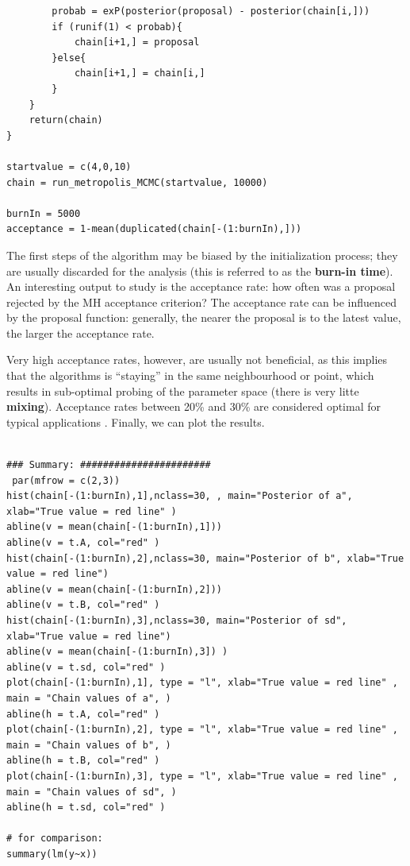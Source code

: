 \begin{Example}
\begin{lstlisting}
        probab = exP(posterior(proposal) - posterior(chain[i,]))
        if (runif(1) < probab){
            chain[i+1,] = proposal
        }else{
            chain[i+1,] = chain[i,]
        }
    }
    return(chain)
}
 
startvalue = c(4,0,10)
chain = run_metropolis_MCMC(startvalue, 10000)
 
burnIn = 5000
acceptance = 1-mean(duplicated(chain[-(1:burnIn),]))
\end{lstlisting}
The first steps of the algorithm may be biased by the initialization process; they are usually discarded for the analysis (this is referred to as the \textbf{burn-in time}). \newpage\noindent An interesting output to study is the acceptance rate: how often was a proposal rejected by the MH acceptance criterion? The acceptance rate can be influenced by the proposal function: generally, the nearer the proposal is to the latest value, the larger the acceptance rate. \par Very high acceptance rates, however, are usually not beneficial, as this implies that the algorithms is ``staying'' in the same neighbourhood or point, which results in sub-optimal probing of the parameter space (there is very litte \textbf{mixing}). Acceptance rates between 20\% and 30\% are considered optimal for typical applications \cite{BDA_N11}.\newl
Finally, we can plot the results. 
\begin{lstlisting}

### Summary: #######################
 par(mfrow = c(2,3))
hist(chain[-(1:burnIn),1],nclass=30, , main="Posterior of a", xlab="True value = red line" )
abline(v = mean(chain[-(1:burnIn),1]))
abline(v = t.A, col="red" )
hist(chain[-(1:burnIn),2],nclass=30, main="Posterior of b", xlab="True value = red line")
abline(v = mean(chain[-(1:burnIn),2]))
abline(v = t.B, col="red" )
hist(chain[-(1:burnIn),3],nclass=30, main="Posterior of sd", xlab="True value = red line")
abline(v = mean(chain[-(1:burnIn),3]) )
abline(v = t.sd, col="red" )
plot(chain[-(1:burnIn),1], type = "l", xlab="True value = red line" , main = "Chain values of a", )
abline(h = t.A, col="red" )
plot(chain[-(1:burnIn),2], type = "l", xlab="True value = red line" , main = "Chain values of b", )
abline(h = t.B, col="red" )
plot(chain[-(1:burnIn),3], type = "l", xlab="True value = red line" , main = "Chain values of sd", )
abline(h = t.sd, col="red" )
 
# for comparison:
summary(lm(y~x))


\end{lstlisting}
\end{Example}

